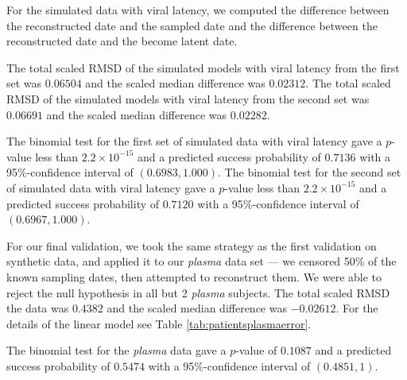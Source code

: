 \documentclass[12pt]{article}
\begin{document}
For the simulated data with viral latency, we computed the difference between the reconstructed date and the sampled date and the difference between the reconstructed date and the become latent date.

The total scaled RMSD of the simulated models with viral latency from the first set was $0.06504$ and the scaled median difference was $0.02312$. The total scaled RMSD of the simulated models with viral latency from the second set was $0.06691$ and the scaled median difference was $0.02282$.

The {binomial test} for the first set of simulated data with viral latency gave a $p$-value less than $2.2\times 10^{-15}$ and a predicted success probability of $0.7136$ with a 95\%-confidence interval of $(0.6983, 1.000)$.
The {binomial test} for the second set of simulated data with viral latency gave a $p$-value less than $2.2\times 10^{-15}$ and a predicted success probability of $0.7120$ with a 95\%-confidence interval of $(0.6967, 1.000)$.


For our final validation, we took the same strategy as the first validation on synthetic data, and applied it to our {\em plasma} data set --- we censored 50\% of the known sampling dates, then attempted to reconstruct them.
We were able to reject the null hypothesis in all but 2 {\em plasma} subjects.
The total scaled RMSD the data was $0.4382$ and the scaled median difference was $-0.02612$.
For the details of the linear model see Table \ref{tab:patientsplasmaerror}.

The {binomial test} for the \emph{plasma} data gave a $p$-value of $0.1087$ and a predicted success probability of $0.5474$ with a 95\%-confidence interval of $(0.4851, 1)$.
\end{document}

